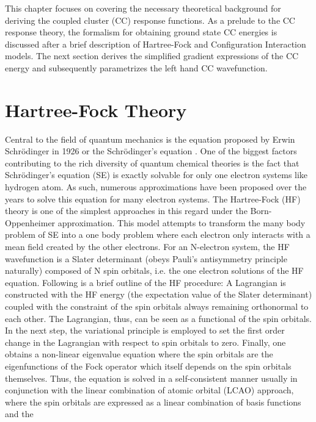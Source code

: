 This chapter focuses on covering the necessary theoretical background 
for deriving the coupled cluster (CC) response functions.
As a prelude to the CC response theory, the formalism for obtaining ground state CC energies 
is discussed after a brief description of Hartree-Fock and Configuration Interaction models.
The next section derives the simplified gradient expressions of the CC energy and subsequently 
parametrizes the left hand CC wavefunction.
\section{Hartree-Fock Theory}
Central to the field of quantum mechanics is the equation proposed by Erwin Schr\"odinger 
in 1926 or the Schr\"odinger's equation \cite{Schrodinger26}. One of the biggest factors 
contributing to the rich diversity of quantum chemical theories is the fact that Schr\"odinger's equation (SE)
is exactly solvable for only one electron systems like hydrogen atom. As such, numerous approximations
have been proposed over the years to solve this equation for many electron systems.
The Hartree-Fock (HF) theory\cite{SzaboOstlund} is one of the simplest approaches in this regard
under the Born-Oppenheimer approximation\cite{Born27}. %
This model attempts to transform the many body problem of SE into a one body problem where each electron
only interacts with a mean field created by the other electrons. For an N-electron system, the HF 
wavefunction is a Slater determinant (obeys Pauli's antisymmetry principle naturally) composed of N 
spin orbitals, i.e. the one electron solutions of the HF equation. Following is a brief outline
of the HF procedure: A Lagrangian is constructed with the HF energy (the expectation value of the 
Slater determinant) coupled with the constraint of the spin orbitals always remaining 
orthonormal to each other. The Lagrangian, thus, can be seen as a functional of the spin 
orbitals. In the next step, the variational principle is employed to set the first order 
change in the Lagrangian with respect to spin orbitals to zero. Finally, one obtains 
a non-linear eigenvalue equation where the spin orbitals are the eigenfunctions of 
the Fock operator which itself depends on the spin orbitals themselves. 
Thus, the equation is solved in a self-consistent manner usually in conjunction with 
the linear combination of atomic orbital (LCAO) approach, where the spin 
orbitals are expressed as a linear combination of basis functions and the 
